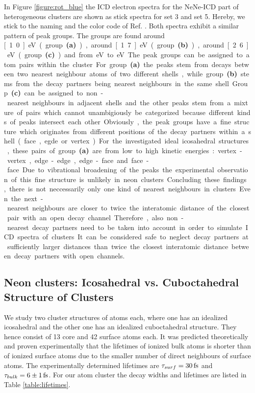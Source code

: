 In Figure \ref{figure:rot_blue} the ICD electron spectra for the NeNe-ICD
part of heterogeneous clusters are shown as stick spectra
for set 3 and set 5. Hereby, we stick to the naming and the color code of
Ref. \cite{Fasshauer14_1}. Both spectra exhibit a similar pattern of peak groups.
The groups are found around \unit[1.0]{eV} (group \textbf{(a)}),
around \unit[1.7]{eV} (group \textbf{(b)}), around \unit[2.6]{eV}
(group \textbf{(c)})
and from \unit[3]{eV} to \unit[4]{eV}.
The peak groups can be assigned to atom pairs
within the cluster. For group \textbf{(a)} the peaks stem from decays
between two nearest neighbour atoms of two different shells,
while group \textbf{(b)}
stems from the decay partners being nearest neighbours in the same shell.
Group \textbf{(c)} can be assigned to non-nearest neighbours in adjacent shells
and the other peaks stem from a mixture of pairs which cannot unambigiously
be categorized because different kinds of peaks intersect each other.

Obviously, the peak groups have a fine structure which originates from
different positions of the decay partners within a shell (face, egde or vertex).
For the investigated ideal icosahedral structures,
these pairs of group \textbf{(a)}
are from low to high kinetic energies: vertex-vertex, edge-edge, edge-face and
face-face. Due to vibrational broadening of the peaks the experimental observation
of this fine structure is unlikely in neon clusters.

Concluding these findings, there is not neccessarily only one kind of nearest
neighbours in clusters. Even the next-nearest neighbours are closer to
twice the interatomic distance of the closest pair with an open decay channel.
Therefore, also non-nearest decay partners need to be taken into account
in order to simulate ICD spectra of clusters.
It can be considered safe to neglect decay partners at sufficiently larger
distances than twice the closest interatomic distance between decay partners
with open channels.


\subsection{Neon clusters: Icosahedral vs. Cuboctahedral Structure of Clusters}
\label{sec:icofcc}
We study two cluster structures of \unit[55]{atoms} each, where one has an
idealized icosahedral and the other one has an idealized cuboctahedral structure.
They hence consist of 13 core and 42 surface atoms each. It was predicted
theoretically and proven experimentally that the lifetimes of ionized bulk atoms
is shorter than of ionized surface atoms due to the smaller number of direct
neighbours of surface atoms. \cite{Santra01_3,Ohrwall04}
The experimentally determined lifetimes are
$\tau_{surf} = \unit[30]{fs}$ and $\tau_{bulk} = \unit[6\pm 1]{fs}$.
For our \unit[55]{atom} cluster the decay widths and lifetimes are listed in
Table \ref{table:lifetimes}.

